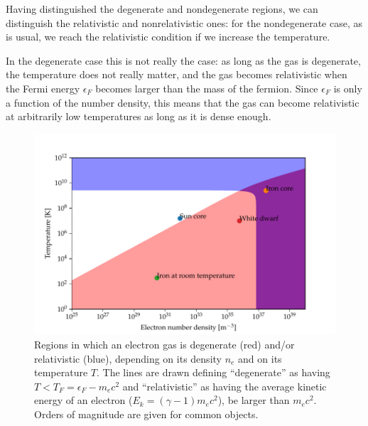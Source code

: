 \documentclass[main.tex]{subfiles}
\begin{document}
Having distinguished the degenerate and nondegenerate regions, we can distinguish the relativistic and nonrelativistic ones: for the nondegenerate case, as is usual, we reach the relativistic condition if we increase the temperature. 

In the degenerate case this is not really the case: as long as the gas is degenerate, the temperature does not really matter, and the gas becomes relativistic when the Fermi energy \(\epsilon _F\) becomes larger than the mass of the fermion.
Since \(\epsilon _F\) is only a function of the number density, this means that the gas can become relativistic at arbitrarily low temperatures as long as it is dense enough.

\begin{figure}[ht]
\centering
\includegraphics[width=\textwidth]{figures/relativisticity_degeneracy.pdf}
\caption{Regions in which an electron gas is degenerate (red) and/or relativistic (blue), depending on its density \(n_e\) and on its temperature \(T\). The lines are drawn defining ``degenerate'' as having \(T < T_F = \epsilon _F - m_e c^2\) and ``relativistic'' as having the average kinetic energy of an electron (\(E_k = (\gamma - 1) m_e c^2\)), be larger than \(m_e c^2\).
Orders of magnitude are given for common objects.}
\label{fig:relativisticity_degeneracy}
\end{figure}
\end{document}

